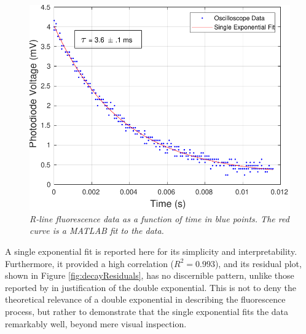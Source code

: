 \documentclass[11pt, a4paper, twocolumn]{article}
\begin{document}
\begin{figure} %
\includegraphics[width=\linewidth]{decayFit.pdf}
\caption{\textit{R-line fluorescence data as a function of time in blue points. The red curve is a MATLAB fit to the data.}
}
\label{fig:decayFit}
\end{figure}

A single exponential fit is reported here for its simplicity and interpretability. Furthermore, it provided a high correlation ($R^2=0.993$), and its residual plot, shown in Figure \ref{fig:decayResiduals}, has no discernible pattern, unlike those reported by \cite{Jones} in justification of the double exponential. This is not to deny the theoretical relevance of a double exponential in describing the fluorescence process, but rather to demonstrate that the single exponential fits the data remarkably well, beyond mere visual inspection.
\end{document}
